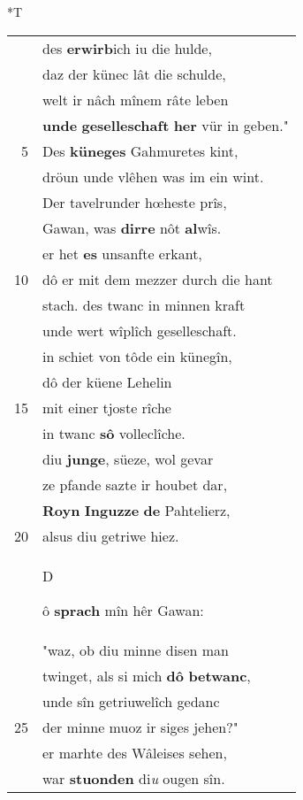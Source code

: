 \documentclass[8pt,a4paper,notitlepage]{article}
\begin{document}
\begin{table}[ht]
\begin{minipage}[t]{0.5\linewidth}
\end{minipage}
\hspace{0.5cm}
\begin{minipage}[t]{0.5\linewidth}
\small
\begin{center}*T
\end{center}
\begin{tabular}{rl}
 & des \textbf{erwirb}ich iu die hulde,\\ 
 & daz der künec lât die schulde,\\ 
 & welt ir nâch mînem râte leben\\ 
 & \textbf{unde} \textbf{geselleschaft} \textbf{her} vür in geben."\\ 
5 & Des \textbf{küneges} Gahmuretes kint,\\ 
 & dröun unde vlêhen was im ein wint.\\ 
 & Der tavelrunder hœheste prîs,\\ 
 & Gawan, was \textbf{dirre} nôt \textbf{al}wîs.\\ 
 & er het \textbf{es} unsanfte erkant,\\ 
10 & dô er mit dem mezzer durch die hant\\ 
 & stach. des twanc in minnen kraft\\ 
 & unde wert wîplîch geselleschaft.\\ 
 & in schiet von tôde ein künegîn,\\ 
 & dô der küene Lehelin\\ 
15 & mit einer tjoste rîche\\ 
 & in twanc \textbf{sô} volleclîche.\\ 
 & diu \textbf{junge}, süeze, wol gevar\\ 
 & ze pfande sazte ir houbet dar,\\ 
 & \textbf{Royn} \textbf{Inguzze} \textbf{de} Pahtelierz,\\ 
20 & alsus diu getriwe hiez.\\ 
 & \begin{large}D\end{large}ô \textbf{sprach} mîn hêr Gawan:\\ 
 & "waz, ob diu minne disen man\\ 
 & twinget, als si mich \textbf{dô} \textbf{betwanc},\\ 
 & unde sîn getriuwelîch gedanc\\ 
25 & der minne muoz ir siges jehen?"\\ 
 & er marhte des Wâleises sehen,\\ 
 & war \textbf{stuonden} di\textit{u} ougen sîn.\\ 

\end{tabular}
\end{minipage}
\end{table}
\end{document}
